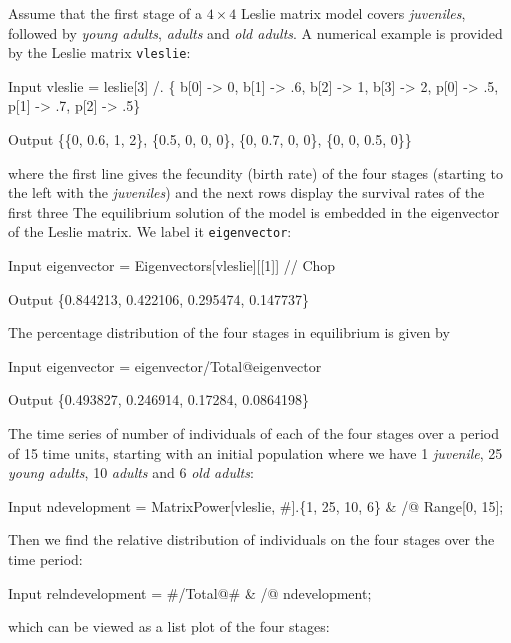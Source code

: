\documentclass[11pt,fleqn]{book} %
\begin{document}
\begin{theorem}
Assume that the first stage of a $4 \times 4$ Leslie matrix model covers \textit{juveniles}, followed by \textit{young adults}, \textit{adults} and \textit{old adults}. A numerical example is provided by the Leslie matrix \texttt{vleslie}:
\begin{mmaCell}{Input}
  vleslie = 
    leslie[3] /. \{
      b[0] -> 0, b[1] -> .6, b[2] -> 1, b[3] -> 2, 
      p[0] -> .5, p[1] -> .7, p[2] -> .5\}
\end{mmaCell}
\begin{mmaCell}{Output}
  \{\{0, 0.6, 1, 2\}, \{0.5, 0, 0, 0\}, \{0, 0.7, 0, 0\}, \{0, 0, 0.5, 0\}\}
\end{mmaCell}
where the first line gives the fecundity (birth rate) of the four stages (starting to the left with the \textit{juveniles}) and the next rows display the survival rates of the first three 
The equilibrium solution of the model is embedded in the eigenvector of the Leslie matrix. We label it \texttt{eigenvector}:
\begin{mmaCell}{Input}
  eigenvector = Eigenvectors[vleslie][[1]] // Chop
\end{mmaCell}
\begin{mmaCell}{Output}
  \{0.844213, 0.422106, 0.295474, 0.147737\}
\end{mmaCell}
The percentage distribution of the four stages in equilibrium is given by
\begin{mmaCell}{Input}
  eigenvector = eigenvector/Total@eigenvector
\end{mmaCell}
\begin{mmaCell}{Output}
  \{0.493827, 0.246914, 0.17284, 0.0864198\}
\end{mmaCell}
The time series of number of individuals of each of the four stages over a period of 15 time units, starting with an initial population where we have 1 \textit{juvenile}, 25 \textit{young adults}, 10 \textit{adults} and 6 \textit{old adults}:
\begin{mmaCell}{Input}
  ndevelopment = 
    MatrixPower[vleslie, #].\{1, 25, 10, 6\} & /@ Range[0, 15];
\end{mmaCell}
Then we find the relative distribution of individuals on the four stages over the time period:
\begin{mmaCell}{Input}
  relndevelopment = #/Total@# & /@ ndevelopment;
\end{mmaCell}
which can be viewed as a list plot of the four stages:

\end{theorem}
\end{document}
